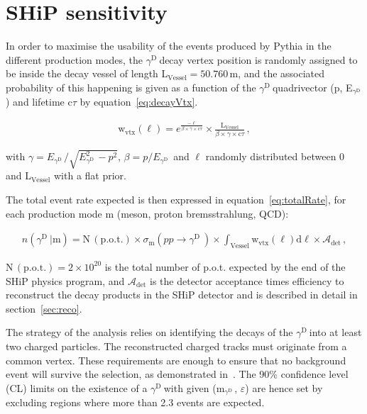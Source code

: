 \documentclass[12pt,a4paper,]{article}
\newcommand{\mathDP}{\gamma^{\mathrm{D}}\ }
\newcommand{\DP}{$\mathDP$}
\newcommand{\mDP}{m$_{\mathDP}$}
\begin{document}
\section{SHiP sensitivity}
\label{sec:sensitivity}

In order to maximise the usability of the events produced by Pythia in
the different production modes, the \DP decay vertex position is
randomly assigned to be inside the decay vessel of length
L$_{\mathrm{Vessel}}= 50.760$\,m, and the associated probability of
this happening is given as a function of the \DP quadrivector (p,
E$_{\mathDP}$) and lifetime $\mathrm{c}\tau$ by
equation~\ref{eq:decayVtx}.

\begin{align}
\mathrm{w}_{\mathrm{vtx}}(\ell) = e^{\frac{-\ell}{\beta\times\gamma\times \mathrm{c}\tau}}\times \frac{\mathrm{L}_{\mathrm{Vessel}}}{\beta\times \gamma \times \mathrm{c}\tau}\,,\label{eq:decayVtx}
\end{align}

with $\gamma = E_{\mathDP}/\sqrt{E_{\mathDP}^2-p^2}$, $\beta =
p/E_{\mathDP}$ and $\ell$ randomly distributed between 0 and
L$_{\mathrm{Vessel}}$ with a flat prior.

The total event rate expected is then expressed in
equation~\ref{eq:totalRate}, for each production mode $\mathrm{m}$
(meson, proton bremsstrahlung, QCD):

\begin{align}
	n(\mathDP | \mathrm{m}) = \mathrm{N\,(p.o.t.)} \times \sigma_{\mathrm{m}}(pp \to \mathDP) \times  \int_{\mathrm{Vessel}} \mathrm{w}_{\mathrm{vtx}}(\ell)\mathrm{d}\ell  \times \mathcal{A}_{\mathrm{det}}\,,\label{eq:totalRate}
\end{align}

$\mathrm{N\,(p.o.t.)} = 2 \times 10^{20}$ is the total number of
p.o.t. expected by the end of the SHiP physics program, and
$\mathcal{A}_{\mathrm{det}}$ is the detector acceptance times efficiency
to reconstruct the decay products in the SHiP detector and is
described in detail in section~\ref{sec:reco}.

The strategy of the analysis relies on identifying the decays of the
\DP into at least two charged particles. The reconstructed charged
tracks must originate from a common vertex. These requirements are
enough to ensure that no background event will survive the selection,
as demonstrated in~\cite{TP,PP}.  The 90\% confidence level (CL) limits on
the existence of a \DP with given (\mDP, $\varepsilon$) are hence set
by excluding regions where more than 2.3 events are expected.
\end{document}
